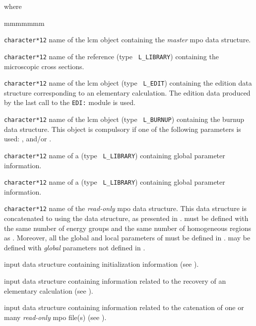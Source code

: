 \noindent where
\begin{ListeDeDescription}{mmmmmmm}

\item[\dusa{MPONAM}] {\tt character*12} name of the {\sc lcm} object containing the
{\sl master} {\sc mpo} data structure.

\item[\dusa{HMIC}] {\tt character*12} name of the reference  (type {\tt
L\_LIBRARY}) containing the microscopic cross sections.

\item[\dusa{EDINAM}] {\tt character*12} name of the {\sc lcm} object (type {\tt
L\_EDIT}) containing the {\sc edition} data structure corresponding to an elementary
calculation. The {\sc edition} data produced by the last call to the {\tt EDI:} module
is used.

\item[\dusa{BRNNAM}] {\tt character*12} name of the {\sc lcm} object (type {\tt
L\_BURNUP}) containing the {\sc burnup} data structure. This object is compulsory if one
of the following parameters is used: ,  and/or .

\item[\dusa{HMIC1}] {\tt character*12} name of a  (type {\tt
L\_LIBRARY}) containing global parameter information.

\item[\dusa{HMIC2}] {\tt character*12} name of a  (type {\tt
L\_LIBRARY}) containing global parameter information.

\item[\dusa{MPORHS}] {\tt character*12} name of the {\sl read-only} {\sc mpo} data structure. This
data structure is concatenated to  using the  data structure,
as presented in .  must be defined with the same number of energy
groups and the same number of homogeneous regions as . Moreover, all the
global and local parameters of  must be defined in . 
may be defined with {\sl global} parameters not defined in .

\item[\dusa{mpo\_data1}] input data structure containing initialization information (see ).

\item[\dusa{mpo\_data2}] input data structure containing information related to the recovery of an
elementary calculation (see ).

\item[\dusa{mpo\_data3}] input data structure containing information related to the catenation of one or many
{\sl read-only} {\sc mpo} file(s) (see ).

\end{ListeDeDescription}

